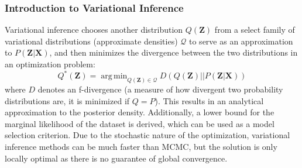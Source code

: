 \documentclass[a4paper,12pt]{article}
\DeclareMathOperator*{\argmin}{arg\,min}
\begin{document}
\subsubsection{Introduction to Variational Inference}
Variational inference chooses another distribution $Q(\textbf{Z})$ from a select family of variational distributions (approximate densities) $\mathcal{Q}$ to serve as an approximation to $P(\textbf{Z}|\textbf{X})$, and then minimizes the divergence between the two distributions in an optimization problem:
\begin{equation}
Q^*(\textbf{Z})=\argmin_{Q(\textbf{Z})\in \mathcal{Q}}D(Q(\textbf{Z})||P(\textbf{Z}|\textbf{X}))
\end{equation} where $D$ denotes an f-divergence (a measure of how divergent two probability distributions are, it is minimized if $Q=P$). This results in an analytical approximation to the posterior density. Additionally, a lower bound for the marginal likelihood of the dataset is derived, which can be used as a model selection criterion. Due to the stochastic nature of the optimization, variational inference methods can be much faster than MCMC, but the solution is only locally optimal as there is no guarantee of global convergence.
\end{document}
